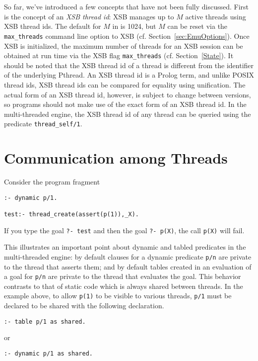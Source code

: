 So far, we've introduced a few concepts that have not been fully
discussed.  First is the concept of an {\em XSB thread id}: XSB
manages up to $M$ active threads using XSB thread ids.  The default
for $M$ in \version{} is 1024, but $M$ can be reset via the {\tt
  max\_threads} command line option to XSB
(cf. Section~\ref{sec:EmuOptions}).  Once XSB is initialized, the
maximum number of threads for an XSB session can be obtained at run
time via the XSB flag {\tt max\_threads} (cf. Section~\ref{State}).
It should be noted that the XSB thread id of a thread is different
from the identifier of the underlying Pthread.  An XSB thread id is a
Prolog term, and unlike POSIX thread ids, XSB thread ids can be
compared for equality using unification.  The actual form of an XSB
thread id, however, is subject to change between versions, so programs
should not make use of the exact form of an XSB thread id.  In the
multi-threaded engine, the XSB thread id of any thread can be queried
using the predicate {\tt thread\_self/1}.

\section{Communication among Threads}

\begin{example}
Consider the program fragment
%
\begin{verbatim}
:- dynamic p/1.

test:- thread_create(assert(p(1)),_X).
\end{verbatim}
If you type the goal {\tt ?- test} and then the goal {\tt ?- p(X)},
the call {\tt p(X)} will fail.  
\end{example}

\noindent
This illustrates an important point about dynamic and tabled
predicates in the multi-threaded engine: by default clauses for a
dynamic predicate {\tt p/n} are private to the thread that asserts
them; and by default tables created in an evaluation of a goal for
{\tt p/n} are private to the thread that evaluates the goal.  This
behavior contrasts to that of static code which is always shared
between threads.  In the example above, to allow {\tt p(1)} to be
visible to various threads, {\tt p/1} must be declared to be shared
with the following declaration.
%
\begin{verbatim}
:- table p/1 as shared.
\end{verbatim}
or
\begin{verbatim}
:- dynamic p/1 as shared.
\end{verbatim}

